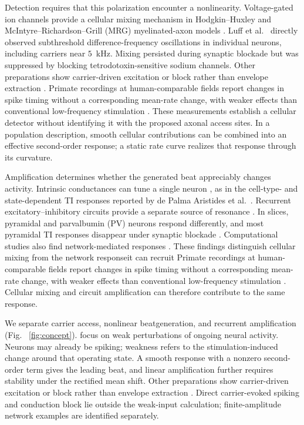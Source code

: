 \documentclass[11pt,a4paper]{article}
\providecommand{\DIFaddtex}[1]{{\protect\color{blue} \sf #1}} %
\providecommand{\DIFdeltex}[1]{{\protect\color{red} \scriptsize #1}} %
\providecommand{\DIFaddbegin}{} %
\providecommand{\DIFaddend}{} %
\providecommand{\DIFdelbegin}{} %
\providecommand{\DIFdelend}{} %
\providecommand{\DIFadd}[1]{\texorpdfstring{\DIFaddtex{#1}}{#1}} %
\providecommand{\DIFdel}[1]{\texorpdfstring{\DIFdeltex{#1}}{}} %
\begin{document}
\DIFaddbegin \DIFadd{Detection requires that this polarization encounter a nonlinearity. }\DIFaddend Voltage-gated
ion channels provide a cellular mixing mechanism in Hodgkin--Huxley
and McIntyre--Richardson--Grill (MRG) myelinated-axon models \cite{mirzakhalili2020}.
Luff et al.\ \cite{luff2024mixer} directly observed subthreshold difference-frequency
oscillations in individual neurons, including carriers near $5$~kHz. Mixing persisted
during synaptic blockade but was suppressed by blocking tetrodotoxin-sensitive sodium
channels. \DIFdelbegin \DIFdel{Other preparations show carrier-driven excitation or block rather than
envelope extraction \cite{opancar2025,peripheral2023,semenov2025}. Primate recordings at
human-comparable fields report changes in spike timing without a corresponding
mean-rate change, with weaker effects than conventional low-frequency stimulation
\cite{vieira2024}.}\DIFdelend \DIFaddbegin \DIFadd{These measurements establish a cellular detector without identifying it
with the proposed axonal access sites. In a population description, smooth cellular
contributions can be combined into an effective second-order response; a static
rate curve realizes that response through its curvature.
}

\DIFadd{Amplification determines whether the generated beat appreciably changes activity.
Intrinsic conductances can tune a single neuron \cite{hutcheonyarom2000}, as in the
cell-type- and state-dependent TI responses reported by de Palma Aristides et al.\
\cite{depalma2026ti}. Recurrent excitatory--inhibitory circuits provide a separate
source of resonance \cite{brunelhakim1999,brunelwang2003,ledoux2011}.
}\DIFaddend In slices, pyramidal and parvalbumin (PV) neurons respond differently,
and most pyramidal TI responses disappear under synaptic blockade \cite{caldas2024}.
Computational studies also find network-mediated responses
\cite{karimi2024,soroushi2025,wangw2026}. \DIFdelbegin \DIFdel{These findings distinguish cellular mixing from
the network responseit can recruit}\DIFdelend \DIFaddbegin \DIFadd{Primate recordings at human-comparable
fields report changes in spike timing without a corresponding mean-rate change,
with weaker effects than conventional low-frequency stimulation \cite{vieira2024}.
Cellular mixing and circuit amplification can therefore contribute to the same
response}\DIFaddend .

We \DIFdelbegin \DIFdel{separate carrier access, nonlinear beatgeneration,
and recurrent amplification (Fig.
~\ref{fig:concept}). }\DIFdelend \DIFaddbegin \DIFadd{focus on weak perturbations of ongoing neural activity. Neurons may already be
spiking; weakness refers to the stimulation-induced change around that operating
state. A smooth response with a nonzero second-order term gives the leading beat,
and linear amplification further requires stability under the rectified mean shift.
Other preparations show carrier-driven excitation or block rather than envelope
extraction \cite{opancar2025,peripheral2023,semenov2025}. Direct carrier-evoked
spiking and conduction block lie outside the weak-input calculation;
finite-amplitude network examples are identified separately.
}
\end{document}
